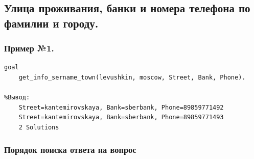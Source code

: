 \documentclass[a4paper,12pt]{article}
\begin{document}
\newpage
	
	\subsection*{Улица проживания, банки и номера телефона по фамилии и городу.}
	
	\subsubsection*{Пример №1.}
	
	\begin{verbatim}
goal
	get_info_sername_town(levushkin, moscow, Street, Bank, Phone).
	
%Вывод:
	Street=kantemirovskaya, Bank=sberbank, Phone=89859771492
	Street=kantemirovskaya, Bank=sberbank, Phone=89859771493
	2 Solutions
	\end{verbatim}
	
	\newpage
	
	\subsubsection*{Порядок поиска ответа на вопрос}
	
\end{document}
